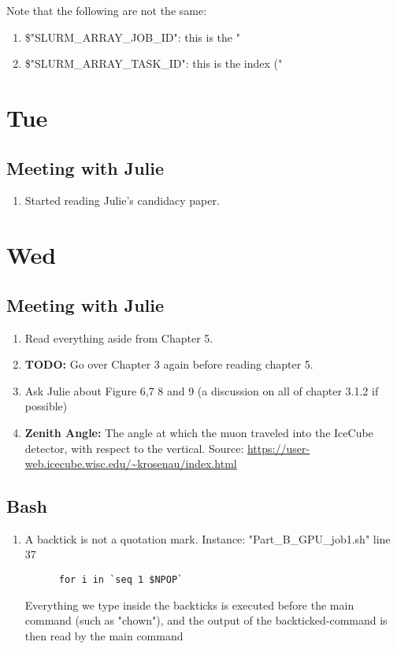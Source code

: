 \documentclass[12pt,letterpaper]{article}
\begin{document}
\noindent Note that the following are not the same:
\begin{enumerate}
  \item \$"SLURM_ARRAY_JOB_ID": this is the "%
  \item \$"SLURM_ARRAY_TASK_ID": this is the index ("%
\end{enumerate}


\section{Tue}
\subsection{Meeting with Julie} 
\begin{enumerate}
  \item Started reading Julie's candidacy paper.
\end{enumerate}

\section{Wed}
\subsection{Meeting with Julie}
\begin{enumerate}
  \item Read everything aside from Chapter 5.
  \item \textbf{TODO:} Go over Chapter 3 again before reading chapter 5.
  \item Ask Julie about Figure 6,7 8 and 9 (a discussion on all of chapter 3.1.2 if
    possible)
  \item \textbf{Zenith Angle:} The angle at which the muon traveled into the
    IceCube detector, with respect to the vertical. Source:
    \url{https://user-web.icecube.wisc.edu/~krosenau/index.html}

\end{enumerate}

\subsection{Bash}
\begin{enumerate}
  \item A backtick is not a quotation mark. Instance: "Part_B_GPU_job1.sh" line 37
    \begin{verbatim}
      for i in `seq 1 $NPOP`
    \end{verbatim}
    Everything we type inside the backticks is executed before the main command
    (such as "chown"), and the output of the backticked-command is then read by
    the main command
\end{enumerate}
\end{document}
